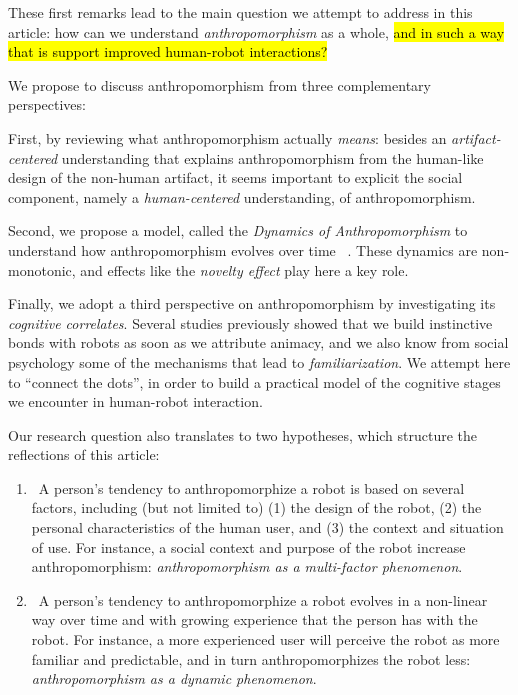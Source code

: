 \documentclass{frontiersSCNS} %
\begin{document}
These first remarks lead to the main question we attempt to address in this
article: how can we understand \emph{anthropomorphism} as a whole, \hl{and in such a
way that is support improved human-robot interactions?}

We propose to discuss anthropomorphism from three
complementary perspectives: 


First, by reviewing what anthropomorphism actually \emph{means}:
besides an \emph{artifact-centered} understanding that explains anthropomorphism from the human-like design of the non-human artifact, it seems important to explicit the social component, namely a \emph{human-centered} understanding, of anthropomorphism.

Second, we propose a model, called the \textit{Dynamics of Anthropomorphism} to understand how anthropomorphism evolves over time ~\citep{lemaignan2014dynamics}.
These dynamics are non-monotonic, and effects like the
\emph{novelty effect} play here a key role.

Finally, we adopt a third perspective on anthropomorphism by investigating its
\emph{cognitive correlates}. Several studies previously showed that we build
instinctive bonds with robots as soon as we attribute animacy, and we also know
from social psychology some of the mechanisms that lead to
\emph{familiarization}. We attempt here to ``connect the dots'', in order to
build a practical model of the cognitive stages we encounter in human-robot
interaction.


Our research question also translates to two
hypotheses, which structure the reflections of this article:

\begin{enumerate} 
\item ~A person's tendency to anthropomorphize a robot
    is based on several factors, including (but not limited to) (1) the
    design of the robot, (2) the personal characteristics of the human user,
    and (3) the context and situation of use. For instance, a social context
    and purpose of the robot increase anthropomorphism: \textit{anthropomorphism
    as a multi-factor phenomenon}.

\item ~A person's tendency to anthropomorphize a robot
    evolves in a non-linear way over time and with growing experience that the
    person has with the robot. For instance, a more experienced user will
    perceive the robot as more familiar and predictable, and in turn
    anthropomorphizes the robot less: \textit{anthropomorphism as a dynamic
    phenomenon}.

\end{enumerate}
\end{document}
